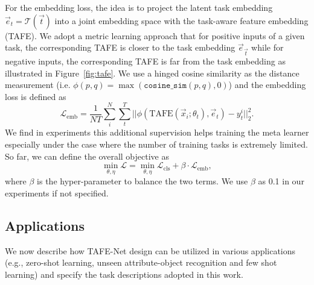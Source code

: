 \documentclass[10pt,twocolumn,letterpaper]{article}
\newcommand{\model}{TAFE-Net\xspace}
\begin{document}
For the embedding loss, the idea is to project the latent task embedding $\Vec{e}_t = \mathcal{T}(\Vec{t})$ into a
joint embedding space with the task-aware feature embedding (TAFE). We adopt a metric learning approach that for positive inputs of a
given task, the corresponding TAFE is 
closer to the task embedding $\Vec{e}_{\Vec{t}}$ while for negative inputs, the corresponding TAFE is
far from the task embedding as illustrated in Figure~\ref{fig:tafe}. We use a hinged cosine similarity as the distance measurement  
(i.e. $\phi(p, q) = \max(\texttt{cosine\_sim}(p, q), 0)$)  and  the embedding loss is defined as 
\begin{equation}
\mathcal{L}_\text{emb} =\frac{1}{NT}\sum_i^N \sum_t^T{||\phi(\text{TAFE}(\Vec{x}_i; \theta_t), \Vec{e}_t)- y_t^i||_2^2}.
\end{equation}
We find in experiments this additional supervision helps training the meta learner especially under the case where the number of training tasks is extremely limited. So far, we can define the overall objective as 
\begin{equation}
\min_{\theta, \eta} \mathcal{L} = \min_{\theta, \eta} \mathcal{L}_\text{cls}
+ \beta \cdot \mathcal{L}_\text{emb},
\end{equation}
where $\beta$ is the hyper-parameter to balance the two terms. We use $\beta$
as 0.1 in our experiments if not specified. 
























 	\subsection{Applications}
\label{sec:app}
We now describe how \model design can be utilized in various applications (e.g., zero-shot learning, 
unseen attribute-object recognition and few shot learning) and specify the task descriptions adopted in this 
work. 
\end{document}
